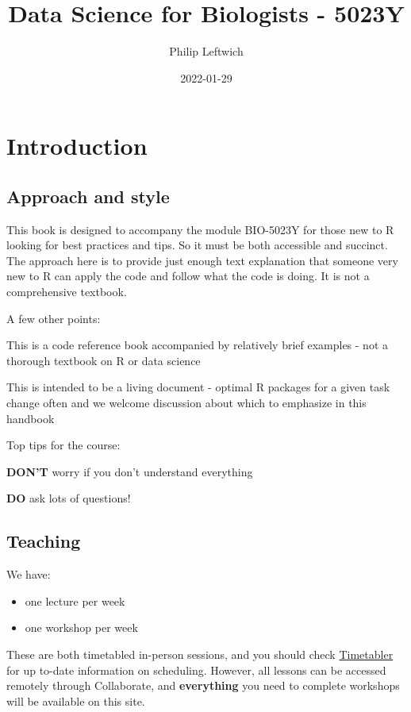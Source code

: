 \documentclass[
]{book}
\title{Data Science for Biologists - 5023Y}
\author{Philip Leftwich}
\date{2022-01-29}
\providecommand{\tightlist}{%
  \setlength{\itemsep}{0pt}\setlength{\parskip}{0pt}}
\begin{document}
\maketitle

{
\setcounter{tocdepth}{1}
\tableofcontents
}
\hypertarget{introduction}{%
\chapter{Introduction}\label{introduction}}

\hypertarget{approach-and-style}{%
\section{Approach and style}\label{approach-and-style}}

This book is designed to accompany the module BIO-5023Y for those new to R looking for best practices and tips. So it must be both accessible and succinct. The approach here is to provide just enough text explanation that someone very new to R can apply the code and follow what the code is doing. It is not a comprehensive textbook.

A few other points:

This is a code reference book accompanied by relatively brief examples - not a thorough textbook on R or data science

This is intended to be a living document - optimal R packages for a given task change often and we welcome discussion about which to emphasize in this handbook

Top tips for the course:

\textbf{DON'T} worry if you don't understand everything

\textbf{DO} ask lots of questions!

\hypertarget{teaching}{%
\section{Teaching}\label{teaching}}

We have:

\begin{itemize}
\tightlist
\item
  one lecture per week
\item
  one workshop per week
\end{itemize}

These are both timetabled in-person sessions, and you should check \href{https://timetabler.uea.ac.uk/Timetable}{Timetabler} for up to-date information on scheduling. However, all lessons can be accessed remotely through Collaborate, and \textbf{everything} you need to complete workshops will be available on this site.
\end{document}
